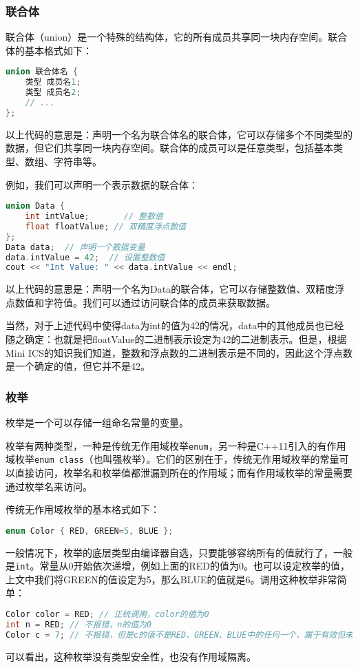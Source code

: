\documentclass[../main.tex]{subfiles}
\begin{document}
\subsubsection{联合体}

联合体（union）是一个特殊的结构体，它的所有成员共享同一块内存空间。联合体的基本格式如下：
\begin{lstlisting}[language=C++]
union 联合体名 {
    类型 成员名1;
    类型 成员名2;
    // ...
};
\end{lstlisting}
以上代码的意思是：声明一个名为联合体名的联合体，它可以存储多个不同类型的数据，但它们共享同一块内存空间。联合体的成员可以是任意类型，包括基本类型、数组、字符串等。

例如，我们可以声明一个表示数据的联合体：
\begin{lstlisting}[language=C++]
union Data {
    int intValue;       // 整数值
    float floatValue; // 双精度浮点数值
};
Data data;  // 声明一个数据变量
data.intValue = 42;  // 设置整数值
cout << "Int Value: " << data.intValue << endl;
\end{lstlisting}
以上代码的意思是：声明一个名为Data的联合体，它可以存储整数值、双精度浮点数值和字符值。我们可以通过访问联合体的成员来获取数据。

当然，对于上述代码中使得data为int的值为42的情况，data中的其他成员也已经随之确定：也就是把floatValue的二进制表示设定为42的二进制表示。但是，根据Mini ICS的知识我们知道，整数和浮点数的二进制表示是不同的，因此这个浮点数是一个确定的值，但它并不是42。

\subsubsection{枚举}

枚举是一个可以存储一组命名常量的变量。

枚举有两种类型，一种是传统无作用域枚举\texttt{enum}，另一种是C++11引入的有作用域枚举\texttt{enum class}（也叫强枚举）。它们的区别在于，传统无作用域枚举的常量可以直接访问，枚举名和枚举值都泄漏到所在的作用域；而有作用域枚举的常量需要通过枚举名来访问。

传统无作用域枚举的基本格式如下：
\begin{lstlisting}[language=C++]
    enum Color { RED, GREEN=5, BLUE };
\end{lstlisting}
一般情况下，枚举的底层类型由编译器自选，只要能够容纳所有的值就行了，一般是\texttt{int}。常量从0开始依次递增，例如上面的RED的值为0。也可以设定枚举的值，上文中我们将GREEN的值设定为5，那么BLUE的值就是6。调用这种枚举非常简单：
\begin{lstlisting}[language=C++]
Color color = RED; // 正统调用，color的值为0
int n = RED; // 不报错，n的值为0
Color c = 7; // 不报错，但是c的值不是RED、GREEN、BLUE中的任何一个，属于有效但未命名的值
\end{lstlisting}
可以看出，这种枚举没有类型安全性，也没有作用域隔离。
\end{document}
